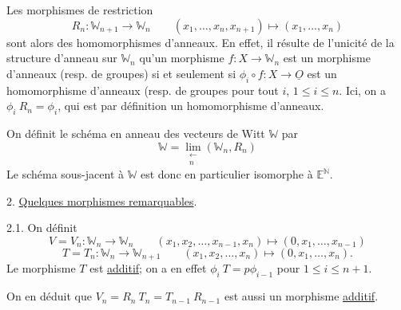 Les morphismes de restriction
\[ R_n : \mathbb{W}_{n+1} \to \mathbb{W}_n \qquad (x_1,\ldots,x_n,x_{n+1}) \mapsto (x_1,\ldots,x_n) \]
sont alors des homomorphismes d'anneaux. En effet, il résulte de
l'unicité de la structure d'anneau sur $\mathbb{W}_n$ qu'un morphisme $f: X \to \mathbb{W}_n$
est un morphisme d'anneaux (resp. de groupes) si et seulement si
$\phi_i \circ f: X \to \underline{O}$ est un homomorphisme d'anneaux (resp. de groupes pour
tout $i$, $1 \leq i \leq n$. Ici, on a $\phi_i\ R_n = \phi_i$, qui est par définition
un homomorphisme d'anneaux.

On définit le schéma en anneau des vecteurs de Witt $\mathbb{W}$ par
\[ \mathbb{W} = \lim_{\substack{\leftarrow \\ n}} (\mathbb{W}_n,R_n) \]
Le schéma sous-jacent à $\mathbb{W}$ est donc en particulier isomorphe à $\mathbb{E}^{\mathbb{N}}$.

2. \uline{Quelques morphismes remarquables}.

2.1. On définit
\[ V = V_n : \mathbb{W}_n \to \mathbb{W}_n \qquad (x_1,x_2,\ldots,x_{n-1},x_n) \mapsto (0,x_1,\ldots,x_{n-1}) \]
\[ T = T_n : \mathbb{W}_n \to \mathbb{W}_{n+1} \qquad (x_1,x_2,\ldots,x_n) \mapsto (0,x_1,\ldots,x_n). \]
Le morphisme $T$ est \uline{additif}; on a en effet $\phi_i\ T = p\phi_{i-1}$
pour $1 \leq i \leq n+1$.

On en déduit que $V_n = R_n\ T_n = T_{n-1}\ R_{n-1}$ est aussi un morphisme
\uline{additif}.

